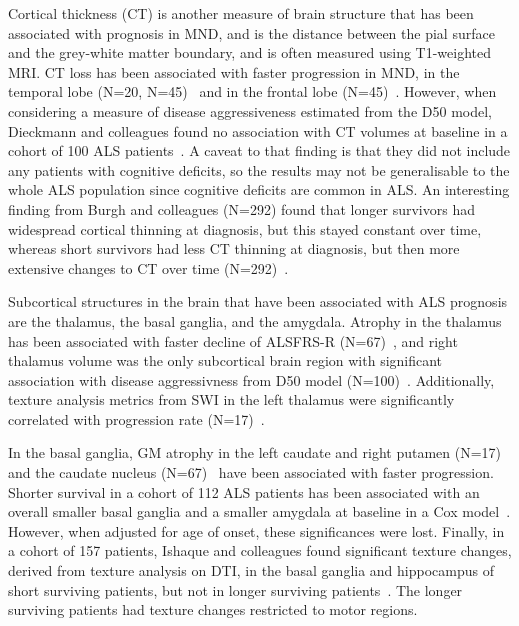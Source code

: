 Cortical thickness (CT) is another measure of brain structure that has been associated with prognosis in MND, and is the distance between the pial surface and the grey-white matter boundary, and is often measured using T1-weighted MRI.
CT loss has been associated with faster progression in MND, in the temporal lobe (N=20, N=45)~\cite{dambrosioFrontotemporalCorticalThinning2014, verstraeteStructuralMRIReveals2012} and in the frontal lobe (N=45)~\cite{verstraeteStructuralMRIReveals2012}.
However, when considering a measure of disease aggressiveness estimated from the D50 model, Dieckmann and colleagues found no association with CT volumes at baseline in a cohort of 100 ALS patients~\cite{dieckmannCorticalSubcorticalGrey2022}.
A caveat to that finding is that they did not include any patients with cognitive deficits, so the results may not be generalisable to the whole ALS population since cognitive deficits are common in ALS.
An interesting finding from Burgh and colleagues (N=292) found that longer survivors had widespread cortical thinning at diagnosis, but this stayed constant over time, whereas short survivors had less CT thinning at diagnosis, but then more extensive changes to CT over time (N=292)~\cite{burghMultimodalLongitudinalStudy2020}.

Subcortical structures in the brain that have been associated with ALS prognosis are the thalamus, the basal ganglia, and the amygdala.
Atrophy in the thalamus has been associated with faster decline of ALSFRS-R (N=67)~\cite{sendaStructuralMRICorrelates2017}, and right thalamus volume was the only subcortical brain region with significant association with disease aggressivness from D50 model (N=100)~\cite{dieckmannCorticalSubcorticalGrey2022}.
Additionally, texture analysis metrics from SWI in the left thalamus were significantly correlated with progression rate (N=17)~\cite{johnsQuantifyingChangesSusceptibility2019}.

In the basal ganglia, GM atrophy in the left caudate and right putamen (N=17)~\cite{agostaLongitudinalAssessmentGrey2009} and the caudate nucleus (N=67)~\cite{sendaStructuralMRICorrelates2017} have been associated with faster progression.
Shorter survival in a cohort of 112 ALS patients has been associated with an overall smaller basal ganglia and a smaller amygdala at baseline in a Cox model~\cite{westenengSubcorticalStructuresAmyotrophic2015}. However, when adjusted for age of onset, these significances were lost.
Finally, in a cohort of 157 patients, Ishaque and colleagues found significant texture changes, derived from texture analysis on DTI, in the basal ganglia and hippocampus of short surviving patients, but not in longer surviving patients~\cite{ishaqueEvaluatingCerebralCorrelates2018}.
The longer surviving patients had texture changes restricted to motor regions.

